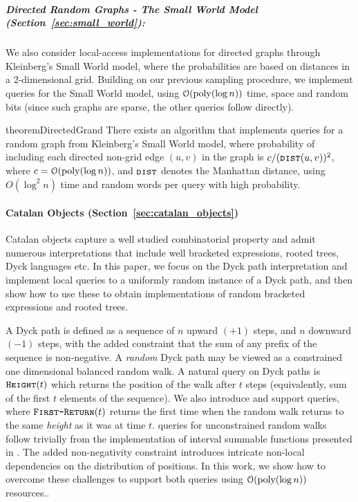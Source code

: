 \subparagraph*{Directed Random Graphs - The Small World Model (Section~\ref{sec:small_world}):}
\label{par:directed_random_graphs}
We also consider local-access implementations for directed graphs through Kleinberg's Small World model,
where the probabilities are based on distances in a 2-dimensional grid.
Building on our previous sampling procedure, we implement  queries for the Small World model,
using $\mathcal{O}(\mathrm{poly}(\log n))$ time, space and random bits (since such graphs are sparse, the other queries follow directly).

\begin{restatable}{theorem}{DirectedGrand}\label{DirectedGrand}
There exists an algorithm that implements  queries for a random graph from Kleinberg's Small World model,
where probability of including each directed non-grid edge $(u,v)$ in the graph is $c/(\texttt{\textsc{dist}}(u,v))^2$,
where $c = \mathcal O(\mathrm{poly}(\log n))$, and $\texttt{\textsc{dist}}$ denotes the Manhattan distance,
using $O(\log^2 n)$ time and random words per query with high probability.
\end{restatable}




\paragraph*{Catalan Objects (Section~\ref{sec:catalan_objects})}%
\label{par:intro_catalan_objects}
Catalan objects capture a well studied combinatorial property and admit numerous interpretations that include
well bracketed expressions, rooted trees, Dyck languages etc.
In this paper, we focus on the Dyck path interpretation and implement local queries to a uniformly random instance of a Dyck path,
and then show how to use these to obtain implementations of random bracketed expressions and rooted trees.

A Dyck path is defined as a sequence of $n$ upward $(+1)$ steps, and $n$ downward $(-1)$ steps,
with the added constraint that the sum of any prefix of the sequence is non-negative.
A \emph{random} Dyck path may be viewed as a constrained one dimensional balanced random walk.
A natural query on Dyck paths is $\texttt{\textsc{Height}}(t)$ which returns the position of the walk after $t$ steps
(equivalently, sum of the first $t$ elements of the sequence).
We also introduce and support  queries, where $\texttt{\textsc{First-Return}}(t)$ returns
the first time when the random walk returns to the same \emph{height} as it was at time $t$.
 queries for unconstrained random walks follow trivially from the implementation of interval summable functions presented in \cite{huge}.
The added non-negativity constraint introduces intricate non-local dependencies on the distribution of positions.
In this work, we show how to overcome these challenges to support both queries using $\mathcal O(\mathrm{poly}(\log n))$ resources..

